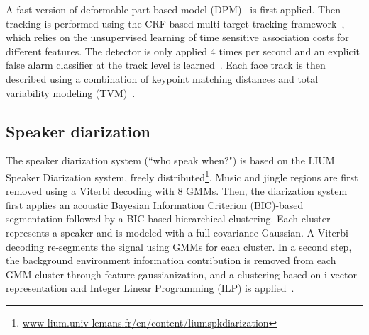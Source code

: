 A fast version of deformable part-based model (DPM)~\cite{dubout2013deformable} is first applied. Then tracking is performed using the CRF-based multi-target tracking framework~\cite{heili2014tracking}, which relies on the unsupervised learning of time sensitive association costs for different features.
%
The detector is only applied 4 times per second and an explicit false alarm classifier at the track level is learned~\cite{Le_ICPR_2016}.
%
Each face track is then described using a combination of keypoint matching distances and total variability modeling (TVM)~\cite{wallace2012total,Khoury:ICMR:2013}.

\subsection{Speaker diarization}

The speaker diarization system (``who speak when?") is based on the LIUM Speaker Diarization system\cite{rouvier2013}, freely distributed\footnote{\url{www-lium.univ-lemans.fr/en/content/liumspkdiarization}}. 
%
Music and jingle regions are first removed using a Viterbi decoding with 8 GMMs.
%
Then, the diarization system first applies an acoustic Bayesian Information Criterion (BIC)-based segmentation followed by a BIC-based hierarchical clustering. Each cluster represents a speaker and is modeled with a full covariance Gaussian. A Viterbi decoding re-segments the signal using GMMs %
for each cluster. 
%
%
In a second step, the background environment information contribution is removed from each GMM cluster through feature gaussianization,
and a clustering based  on i-vector representation  and Integer Linear Programming (ILP) is applied~\cite{rouvier12-2}. 

